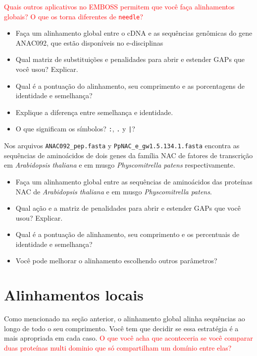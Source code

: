 \documentclass[letter,11pt]{book}
\begin{document}
\textcolor{red}{Quais outros aplicativos no EMBOSS permitem que você faça alinhamentos globais? O que os torna diferentes de \Verb+needle+?}

{\color{red}
\begin{itemize}
\item Faça um alinhamento global entre o cDNA e as sequências genômicas do gene ANAC092, que estão disponíveis no e-disciplinas
\item Qual matriz de substituições e penalidades para abrir e estender GAPs que você usou? Explicar.
\item Qual é a pontuação do alinhamento, seu comprimento e as porcentagens de identidade e semelhança?
\item Explique a diferença entre semelhança e identidade.
\item O que significam os símbolos? \Verb+:+, \Verb+.+ y \Verb+|+?
\end{itemize}
}

Nos arquivos \Verb+ANAC092_pep.fasta+ y \Verb+PpNAC_e_gw1.5.134.1.fasta+ encontra as sequências de aminoácidos de dois genes da família NAC de fatores de transcrição em \textit{Arabidopsis thaliana} e em musgo \textit{Physcomitrella patens} respectivamente.

{\color{red}
\begin{itemize}
\item Faça um alinhamento global entre as sequências de aminoácidos das proteínas NAC de \textit{Arabidopsis thaliana} e em musgo \textit{Physcomitrella patens}.
\item Qual ação e a matriz de penalidades para abrir e estender GAPs que você usou? Explicar.
\item Qual é a pontuação de alinhamento, seu comprimento e os percentuais de identidade e semelhança?
\item Você pode melhorar o alinhamento escolhendo outros parâmetros?
\end{itemize}
}

\section{Alinhamentos locais}

Como mencionado na seção anterior, o alinhamento global alinha sequências ao longo de todo o seu comprimento. Você tem que decidir se essa estratégia é a mais apropriada em cada caso. \textcolor{red}{O que você acha que aconteceria se você comparar duas proteínas multi dominio que só compartilham um domínio entre elas?}
\end{document}
